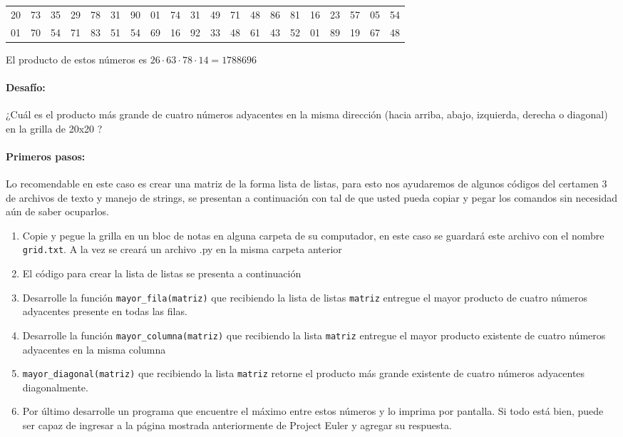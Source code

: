 \begin{table}[H]
\begin{tabular}{llllllllllllllllllll}
20 & 73 & 35 & 29 & 78 & 31 & 90 & 01                      & 74                               & 31                               & 49                               & 71                               & 48 & 86 & 81 & 16 & 23 & 57 & 05 & 54 \\
01 & 70 & 54 & 71 & 83 & 51 & 54 & 69                      & 16                               & 92                               & 33                               & 48                               & 61 & 43 & 52 & 01 & 89 & 19 & 67 & 48
\end{tabular}
\end{table}

El producto de estos números es $26 \cdot 63 \cdot 78 \cdot 14 = 1788696 $

\paragraph{Desafío:} ¿Cuál es el producto más grande de cuatro números adyacentes en la misma dirección (hacia arriba, abajo, izquierda, derecha o diagonal) en la grilla de 20x20 ?

\paragraph{Primeros pasos:} Lo recomendable en este caso es crear una matriz de la forma lista de listas, para esto nos ayudaremos de algunos códigos del certamen 3 de archivos de texto y manejo de strings, se presentan a continuación con tal de que usted pueda copiar y pegar los comandos sin necesidad aún de saber ocuparlos.

\begin{enumerate}
    \item Copie y pegue la grilla en un bloc de notas en alguna carpeta de su computador, en este caso se guardará este archivo con el nombre \texttt{grid.txt}. A la vez se creará un archivo .py en la misma carpeta anterior
    \item El código para crear la lista de listas se presenta a continuación
    
    
    \item Desarrolle la función \texttt{mayor\_fila(matriz)} que recibiendo la lista de listas \texttt{matriz} entregue el mayor producto de cuatro números adyacentes presente en todas las filas.
    \item Desarrolle la función \texttt{mayor\_columna(matriz)} que recibiendo la lista \texttt{matriz} entregue el mayor producto existente de cuatro números adyacentes en la misma columna
    \item \texttt{mayor\_diagonal(matriz)} que recibiendo la lista \texttt{matriz} retorne el producto más grande existente de cuatro números adyacentes diagonalmente.
    \item Por último desarrolle un programa que encuentre el máximo entre estos números y lo imprima por pantalla. Si todo está bien, puede ser capaz de ingresar a la página mostrada anteriormente de Project Euler y agregar su respuesta.
\end{enumerate}
